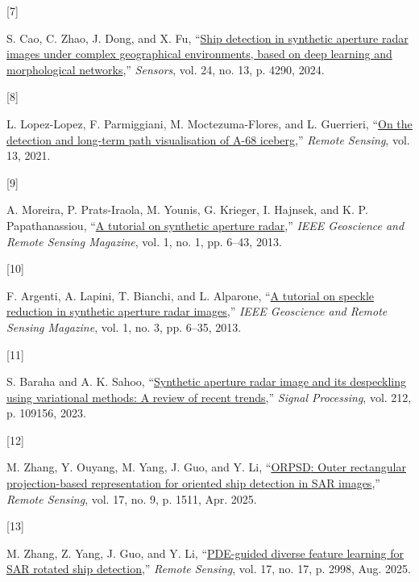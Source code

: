 \documentclass[
  lettersize  journal,
]{IEEEtran}%
\newlength{\cslhangindent}
\newlength{\csllabelwidth}
\newenvironment{CSLReferences}[2] %
 {\begin{list}{}{%
  \setlength{\itemindent}{0pt}
  \setlength{\leftmargin}{0pt}
  \setlength{\parsep}{0pt}
  \ifodd #1
   \setlength{\leftmargin}{\cslhangindent}
   \setlength{\itemindent}{-1\cslhangindent}
  \fi
  \setlength{\itemsep}{#2\baselineskip}}}
 {\end{list}}
\newcommand{\CSLLeftMargin}[1]{\parbox[t]{\csllabelwidth}{\strut#1\strut}}
\newcommand{\CSLRightInline}[1]{\parbox[t]{\linewidth - \csllabelwidth}{\strut#1\strut}}
\providecommand{\DIFaddbegin}{} %
\providecommand{\DIFaddend}{} %
\providecommand{\DIFdelbegin}{} %
\providecommand{\DIFdelend}{} %
\providecommand{\DIFscaledelfig}{0.5}
\newlength{\DIFdelgraphicswidth} %
\newlength{\DIFdelgraphicsheight} %
\providecommand{\DIFaddincludegraphics}[2][]{{\color{blue}\fbox{\DIFOincludegraphics[#1]{#2}}}} %
\providecommand{\DIFdelincludegraphics}[2][]{%
\sbox{\DIFdelgraphicsbox}{\DIFOincludegraphics[#1]{#2}}%
\settoboxwidth{\DIFdelgraphicswidth}{\DIFdelgraphicsbox} %
\settoboxtotalheight{\DIFdelgraphicsheight}{\DIFdelgraphicsbox} %
\scalebox{\DIFscaledelfig}{%
\parbox[b]{\DIFdelgraphicswidth}{\usebox{\DIFdelgraphicsbox}\\[-\baselineskip] \rule{\DIFdelgraphicswidth}{0em}}\llap{\resizebox{\DIFdelgraphicswidth}{\DIFdelgraphicsheight}{%
\setlength{\unitlength}{\DIFdelgraphicswidth}%
\begin{picture}(1,1)%
\thicklines\linethickness{2pt} %
{\color[rgb]{1,0,0}\put(0,0){\framebox(1,1){}}}%
{\color[rgb]{1,0,0}\put(0,0){\line( 1,1){1}}}%
{\color[rgb]{1,0,0}\put(0,1){\line(1,-1){1}}}%
\end{picture}%
}\hspace*{3pt}}} %
} %
\DeclareRobustCommand{\DIFaddbegin}{\DIFOaddbegin \let\includegraphics\DIFaddincludegraphics} %
\DeclareRobustCommand{\DIFaddend}{\DIFOaddend \let\includegraphics\DIFOincludegraphics} %
\DeclareRobustCommand{\DIFdelbegin}{\DIFOdelbegin \let\includegraphics\DIFdelincludegraphics} %
\DeclareRobustCommand{\DIFdelend}{\DIFOaddend \let\includegraphics\DIFOincludegraphics} %
\begin{document}
\begin{CSLReferences}{0}{0}
\CSLLeftMargin{{[}7{]} }%
\CSLRightInline{S. Cao, C. Zhao, J. Dong, and X. Fu,
{``\href{https://doi.org/10.3390/s24134290}{Ship detection in synthetic
aperture radar images under complex geographical environments, based on
deep learning and morphological networks},''} \emph{Sensors}, vol. 24,
no. 13, p. 4290, 2024. }

\CSLLeftMargin{{[}8{]} }%
\CSLRightInline{L. Lopez-Lopez, F. Parmiggiani, M. Moctezuma-Flores, and
L. Guerrieri, {``\href{https://doi.org/10.3390/rs13030460}{On the
detection and long-term path visualisation of {A}-68 iceberg},''}
\emph{Remote Sensing}, vol. 13, 2021. }

\CSLLeftMargin{{[}9{]} }%
\CSLRightInline{A. Moreira, P. Prats-Iraola, M. Younis, G. Krieger, I.
Hajnsek, and K. P. Papathanassiou,
{``\href{https://doi.org/10.1109/mgrs.2013.2248301}{A tutorial on
synthetic aperture radar},''} \emph{IEEE Geoscience and Remote Sensing
Magazine}, vol. 1, no. 1, pp. 6--43, 2013. }

\CSLLeftMargin{{[}10{]} }%
\CSLRightInline{F. Argenti, A. Lapini, T. Bianchi, and L. Alparone,
{``\href{https://doi.org/10.1109/mgrs.2013.2277512}{A tutorial on
speckle reduction in synthetic aperture radar images},''} \emph{IEEE
Geoscience and Remote Sensing Magazine}, vol. 1, no. 3, pp. 6--35, 2013.
}

\CSLLeftMargin{{[}11{]} }%
\CSLRightInline{S. Baraha and A. K. Sahoo,
{``\href{https://doi.org/10.1016/j.sigpro.2023.109156}{Synthetic
aperture radar image and its despeckling using variational methods: A
review of recent trends},''} \emph{Signal Processing}, vol. 212, p.
109156, 2023. }

\DIFdelbegin {}
\DIFdelend \DIFaddbegin {}
\DIFaddend \CSLLeftMargin{{[}12{]} }%
\DIFaddbegin \CSLRightInline{M. Zhang, Y. Ouyang, M. Yang, J. Guo, and Y. Li,
{``\href{https://doi.org/10.3390/rs17091511}{{ORPSD}: Outer rectangular
projection-based representation for oriented ship detection in {SAR}
images},''} \emph{Remote Sensing}, vol. 17, no. 9, p. 1511, Apr. 2025. }

\CSLLeftMargin{{[}13{]} }%
\CSLRightInline{M. Zhang, Z. Yang, J. Guo, and Y. Li,
{``\href{https://doi.org/10.3390/rs17172998}{{PDE}-guided diverse
feature learning for {SAR} rotated ship detection},''} \emph{Remote
Sensing}, vol. 17, no. 17, p. 2998, Aug. 2025. }


\end{CSLReferences}
\end{document}
